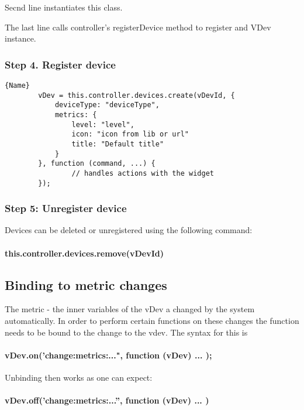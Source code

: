 Secnd line instantiates this class.

The last line calls controller's registerDevice method to register and VDev instance.

\subsubsection{Step 4. Register device}

\begin{lstlisting}[caption=Register Device,basicstyle=\small,columns=fullflexible]{Name} 
        vDev = this.controller.devices.create(vDevId, {
            deviceType: "deviceType",
            metrics: {
                level: "level",
                icon: "icon from lib or url"
                title: "Default title"
            }
        }, function (command, ...) {
                // handles actions with the widget
        });  
\end{lstlisting}

\subsubsection{Step 5: Unregister device}

Devices can be deleted or unregistered  using the following command:

\paragraph{this.controller.devices.remove(vDevId)}

\subsection{Binding to metric changes}

The metric - the inner variables of the vDev a changed by the system automatically.
In order to perform certain functions on these changes the function needs to be 
bound to the change to the vdev. The syntax for this is

\paragraph{vDev.on('change:metrics:...", function (vDev) { ... });}


Unbinding then works as one can expect:

\paragraph{vDev.off(’change:metrics:...”, function (vDev) ... )} 

